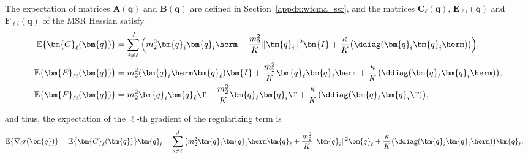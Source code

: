 The expectation of matrices $\bm{A}(\bm{q})$ and $\bm{B}(\bm{q})$ are defined in Section~\ref{appdx:wfcma_ssr}, and the matrices $\bm{C}_{\ell}(\bm{q})$, $\bm{E}_{{\ell}i}(\bm{q})$ and $\bm{F}_{{\ell}i}(\bm{q})$ of the MSR Hessian satisfy
\begin{align}
\mathbb{E}\{\bm{C}_{\ell}(\bm{q})\}&=\sum_{i\neq {\ell}}^J\Big(   m_2^2\bm{q}_i\bm{q}_i\herm +\frac{m_2^2}{K}  \|\bm{q}_i\|^2\bm{I}+ \frac{\kappa}{K}  \big(\ddiag(\bm{q}_i\bm{q}_i\herm)\big)\Big),\nonumber\\
\mathbb{E}\{\bm{E}_{{\ell}i}(\bm{q})\}&=  m_2^2(\bm{q}_i\herm\bm{q}_{\ell})\bm{I}+ \frac{  m_2^2}{K}\bm{q}_{\ell}\bm{q}_i\herm+\frac{\kappa}{K}\big(\ddiag(\bm{q}_{\ell}\bm{q}_i\herm)\big),\nonumber\\
\mathbb{E}\{\bm{F}_{{\ell}i}(\bm{q})\}&=  m_2^2\bm{q}_i\bm{q}_{\ell}\T+\frac{  m_2^2}{K}\bm{q}_{\ell}\bm{q}_i\T+ \frac{\kappa}{K}\big(\ddiag(\bm{q}_{\ell}\bm{q}_i\T)\big),\nonumber
\end{align}


and thus, the expectation of the ${\ell}$-th gradient of the regularizing term is
\begin{align}
\mathbb{E}\{\nabla_{\ell} r(\bm{q})\}&=\mathbb{E}\big\{\bm{C}_{\ell}(\bm{q})\big\}\bm{q}_{\ell}
= \sum_{i\neq {\ell}}^J\big(   m_2^2\bm{q}_i\bm{q}_i\herm\bm{q}_{\ell} +\frac{m_2^2}{K}  \|\bm{q}_i\|^2\bm{q}_{\ell}+ \frac{\kappa}{K}  \big(\ddiag(\bm{q}_i\bm{q}_i\herm)\big)\bm{q}_{\ell}. \label{eqn:expectation_gradient_msr}
\end{align}

